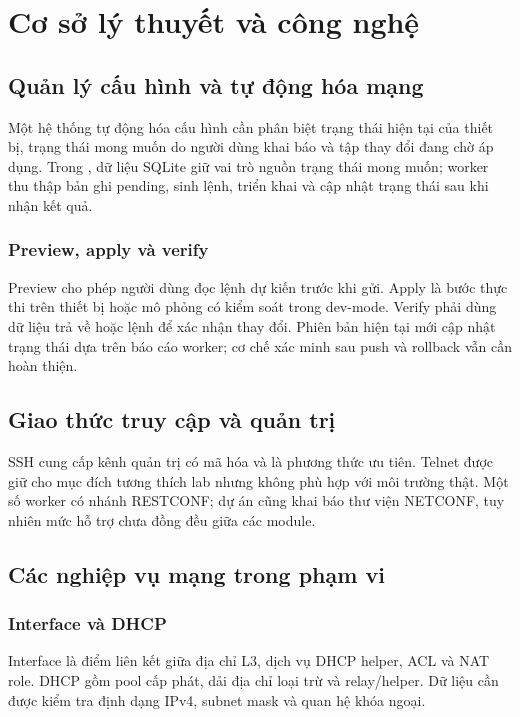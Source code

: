 \chapter{Cơ sở lý thuyết và công nghệ}
\label{chap:co-so-ly-thuyet}

\section{Quản lý cấu hình và tự động hóa mạng}

Một hệ thống tự động hóa cấu hình cần phân biệt trạng thái hiện tại của thiết bị, trạng thái mong muốn do người dùng khai báo và tập thay đổi đang chờ áp dụng. Trong \SoftwareName, dữ liệu SQLite giữ vai trò nguồn trạng thái mong muốn; worker thu thập bản ghi pending, sinh lệnh, triển khai và cập nhật trạng thái sau khi nhận kết quả.

\subsection{Preview, apply và verify}

Preview cho phép người dùng đọc lệnh dự kiến trước khi gửi. Apply là bước thực thi trên thiết bị hoặc mô phỏng có kiểm soát trong dev-mode. Verify phải dùng dữ liệu trả về hoặc lệnh  để xác nhận thay đổi. Phiên bản hiện tại mới cập nhật trạng thái dựa trên báo cáo worker; cơ chế xác minh sau push và rollback vẫn cần hoàn thiện.

\section{Giao thức truy cập và quản trị}

SSH cung cấp kênh quản trị có mã hóa và là phương thức ưu tiên. Telnet được giữ cho mục đích tương thích lab nhưng không phù hợp với môi trường thật. Một số worker có nhánh RESTCONF; dự án cũng khai báo thư viện NETCONF, tuy nhiên mức hỗ trợ chưa đồng đều giữa các module.

\section{Các nghiệp vụ mạng trong phạm vi}

\subsection{Interface và DHCP}

Interface là điểm liên kết giữa địa chỉ L3, dịch vụ DHCP helper, ACL và NAT role. DHCP gồm pool cấp phát, dải địa chỉ loại trừ và relay/helper. Dữ liệu cần được kiểm tra định dạng IPv4, subnet mask và quan hệ khóa ngoại.

